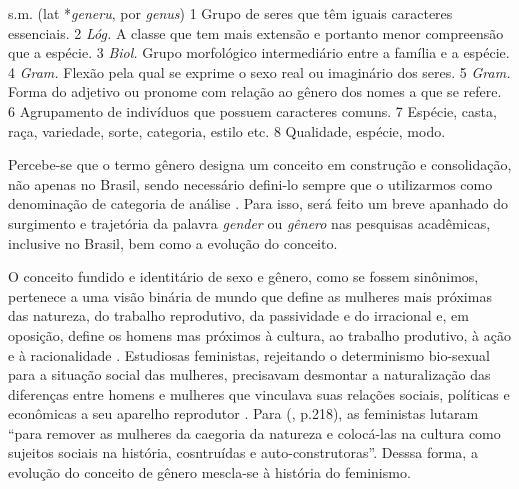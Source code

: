 \begin{citacao}
s.m. (lat *\emph{generu}, por \emph{genus}) 1 Grupo de seres que têm iguais caracteres essenciais. 2 \emph{Lóg.} A classe que tem mais extensão e portanto menor compreensão que a espécie. 3 \emph{Biol.} Grupo morfológico intermediário entre a família e a espécie. 4 \emph{Gram.} Flexão pela qual se exprime o sexo real ou imaginário dos seres. 5 \emph{Gram.} Forma do adjetivo ou pronome com relação ao gênero dos nomes a que se refere. 6 Agrupamento de indivíduos que possuem caracteres comuns. 7 Espécie, casta, raça, variedade, sorte, categoria, estilo etc. 8 Qualidade, espécie, modo.
\end{citacao}

Percebe-se que o termo gênero designa um conceito em construção e consolidação, não apenas no Brasil, sendo necessário defini-lo sempre que o utilizarmos como denominação de categoria de análise \cite{MORAES1998}. Para isso, será feito um breve apanhado do surgimento e trajetória da palavra \emph{gender} ou \emph{gênero} nas pesquisas acadêmicas, inclusive no Brasil, bem como a evolução do conceito.

O conceito fundido e identitário de sexo e gênero, como se fossem sinônimos, pertenece a uma visão binária de mundo que define as mulheres mais próximas das natureza, do trabalho reprodutivo, da passividade e do irracional e, em oposição, define os homens mas próximos à cultura, ao trabalho produtivo, à ação e à racionalidade \cite{HARAWAY2004}.
Estudiosas feministas, rejeitando o determinismo bio-sexual para a situação social das mulheres, precisavam desmontar a naturalização das diferenças entre homens e mulheres que vinculava suas relações sociais, políticas e econômicas a seu aparelho reprodutor \cite{PISCITELLI2009}. 
Para  (\citeyear{HARAWAY2004}, p.218), as feministas lutaram ``para remover as mulheres da caegoria da natureza e colocá-las na cultura como sujeitos sociais na história, cosntruídas e auto-construtoras''. Desssa forma, a evolução do conceito de gênero mescla-se à história do feminismo.

